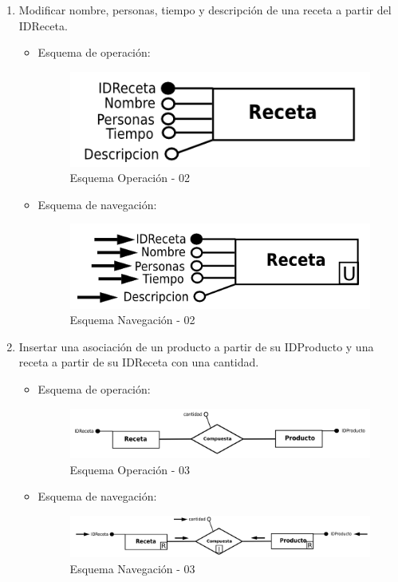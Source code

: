 \documentclass[a4paper,12pt]{report}
\begin{document}
\begin{enumerate}
\item Modificar nombre, personas, tiempo y descripción de una receta
a partir del IDReceta.
\begin{itemize}
\item Esquema de operación:
\begin{figure}[!htp]
\centering
\includegraphics[width=0.9\linewidth]{./operaciones/img/Recetas/02_ope.png}
\caption{Esquema Operación - 02}
\label{fig:ope02}
\medskip
\footnotesize
{}
\end{figure}
\item Esquema de navegación:
\begin{figure}[!htp]
\centering
\includegraphics[width=0.9\linewidth]{./operaciones/img/Recetas/02_nav.png}
\caption{Esquema Navegación - 02}
\label{fig:nave02}
\medskip
\footnotesize
{}
\end{figure}
\end{itemize}

\item Insertar una asociación de un producto a partir de su
IDProducto y una receta a partir de su IDReceta con una
cantidad.
\begin{itemize}
\item Esquema de operación:
\begin{figure}[!htp]
\centering
\includegraphics[width=0.9\linewidth]{./operaciones/img/Recetas/03_ope.png}
\caption{Esquema Operación - 03}
\label{fig:ope03}
\medskip
\footnotesize
{}
\end{figure}
\item Esquema de navegación:
\begin{figure}[!htp]
\centering
\includegraphics[width=0.9\linewidth]{./operaciones/img/Recetas/03_nav.png}
\caption{Esquema Navegación - 03}
\label{fig:nave03}
\medskip
\footnotesize
{}
\end{figure}
\end{itemize}


\end{enumerate}
\end{document}
